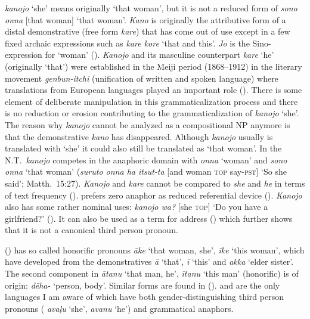 \documentclass[output=collectionpaper]{langsci/langscibook}
\begin{document}
 \textit{kanojo} ‘she’ means originally ‘that woman’, but it is not a reduced form of \textit{sono onna} [that woman] ‘that woman’. \textit{Kano} is originally the attributive form of a distal demonstrative (free form \textit{kare}) that has come out of use except in a few fixed archaic expressions such as \textit{kare kore} ‘that and this’. \textit{Jo} is the Sino- expression for ‘woman’ (\citealt[141]{Ishiyama2008}). \textit{Kanojo} and its masculine counterpart \textit{kare} ‘he’ (originally ‘that’) were established in the Meiji period (1868--1912) in the literary movement \textit{genbun-itchi} (unification of written and spoken language) where translations from European languages played an important role (\citealt[139]{Ishiyama2008}). There is some element of deliberate manipulation in this grammaticalization process and there is no reduction or erosion contributing to the grammaticalization of \textit{kanojo} ‘she’. The reason why \textit{kanojo} cannot be analyzed as a compositional NP anymore is that the demonstrative \textit{kano} has disappeared. Although \textit{kanojo} usually is translated with ‘she’ it could also still be translated as ‘that woman’. In the N.T.\ \textit{kanojo} competes in the anaphoric domain with \textit{onna} ‘woman’ and \textit{sono onna} ‘that woman’ (\textit{suruto onna ha itsut-ta} [and woman \textsc{top} say-\textsc{pst}] ‘So she said’; Matth.~15:27). \textit{Kanojo} and \textit{kare} cannot be compared to \textit{she} and \textit{he} in terms of text frequency (\citealt[36]{Ishiyama2008}).  prefers zero anaphor as reduced referential device (\citealt[44]{Kibrik2011}). \textit{Kanojo} also has some rather nominal uses: \textit{kanojo wa?} [she \textsc{top}] ‘Do you have a girlfriend?’ (\citealt[232]{Ishiyama2008}). It can also be used as a term for address (\citealt[232]{Ishiyama2008}) which further shows that it is not a canonical third person pronoun.

 () has so called honorific pronouns \textit{āke} ‘that woman, she’, \textit{īke} ‘this woman’, which have developed from the demonstratives \textit{ā} ‘that’, \textit{ī} ‘this’ and \textit{akka} ‘elder sister’. The second component in \textit{ātanu} ‘that man, he’, \textit{ītanu} ‘this man’ (honorific) is of  origin: \textit{dēha-} ‘person, body’. Similar forms are found in  (\citealt[171]{Andronov2003}).  and  are the only languages I am aware of which have both gender-distinguishing third person pronouns ( \textit{avaḷu} ‘she’, \textit{avanu} ‘he’) and grammatical anaphors.
\end{document}
